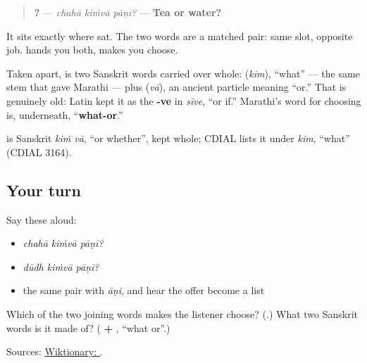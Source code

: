\begin{quote}
\textbf{  ?} — \emph{chahā kiṁvā pāṇī?} — \textbf{Tea or water?}
\end{quote}

It sits exactly where \textbf{} sat. The two words are a matched pair: same slot, opposite job. \textbf{} hands you both, \textbf{} makes you choose.

Taken apart, \textbf{} is two Sanskrit words carried over whole: \textbf{} (\emph{kim}), \textquotedblleft{}what\textquotedblright{} — the same stem that gave Marathi \textbf{} — plus \textbf{} (\emph{vā}), an ancient particle meaning \textquotedblleft{}or.\textquotedblright{} That \textbf{} is genuinely old: Latin kept it as the \textbf{-ve} in \emph{sīve}, \textquotedblleft{}or if.\textquotedblright{} Marathi's word for choosing is, underneath, \textquotedblleft{}\textbf{what-or}.\textquotedblright{}

\begin{cousinweb}
\textbf{} is Sanskrit \emph{kiṁ vā}, \textquotedblleft{}or whether\textquotedblright{}, kept whole; CDIAL lists it under \emph{kim}, \textquotedblleft{}what\textquotedblright{} (CDIAL 3164).
\end{cousinweb}

\subsection*{Your turn}
Say these aloud:

\begin{itemize}
\raggedright
  \item \emph{chahā kiṁvā pāṇī?}
  \item \emph{dūdh kiṁvā pāṇī?}
  \item the same pair with \emph{āṇi}, and hear the offer become a list
\end{itemize}

\begin{tcolorbox}[breakable,colback=teal!4,colframe=teal!35!black,title={Before you move on}]
Which of the two joining words makes the listener choose? (\textbf{}.) What two Sanskrit words is it made of? (\textbf{ + }, \textquotedblleft{}what or\textquotedblright{}.)

Sources: \href{https://en.wiktionary.org/wiki/\%E0\%A4\%95\%E0\%A4\%BF\%E0\%A4\%82\%E0\%A4\%B5\%E0\%A4\%BE}{Wiktionary: }.
\end{tcolorbox}
